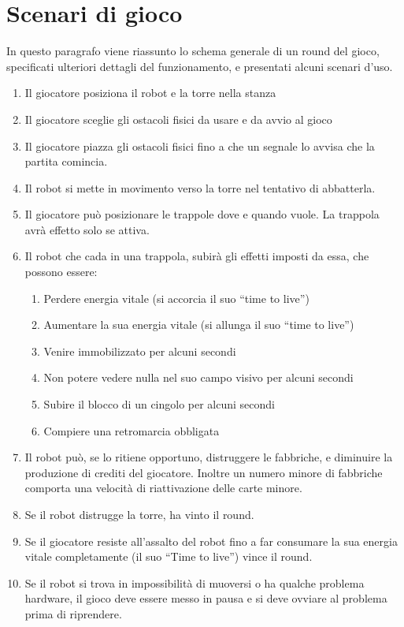 \section{Scenari di gioco}
In questo paragrafo viene riassunto lo schema generale di un round del gioco, specificati ulteriori dettagli del funzionamento, e presentati alcuni scenari d'uso.
\begin{enumerate}
    \item Il giocatore posiziona il robot e la torre nella stanza
	\item Il giocatore sceglie gli ostacoli fisici da usare e da avvio al gioco
	\item Il giocatore piazza gli ostacoli fisici fino a che un segnale lo avvisa che la partita comincia.
	\item Il robot si mette in movimento verso la torre nel tentativo di abbatterla.
	\item Il giocatore può posizionare le trappole dove e quando vuole. La trappola avrà effetto solo se attiva.
	\item Il robot che cada in una trappola, subirà gli effetti imposti da essa, che possono essere:
		\begin{enumerate}
		\item Perdere energia vitale (si accorcia il suo ``time to live'')
		\item Aumentare la sua energia vitale (si allunga il suo ``time to live'')
		\item Venire immobilizzato per alcuni secondi
		\item Non potere vedere nulla nel suo campo visivo per alcuni secondi
		\item Subire il blocco di un cingolo per alcuni secondi
		\item Compiere una retromarcia obbligata
		\end{enumerate}
	\item Il robot può, se lo ritiene opportuno, distruggere le fabbriche, e diminuire la produzione di crediti del giocatore. Inoltre un numero minore di fabbriche comporta una  velocità di riattivazione delle carte minore.
	\item Se il robot distrugge la torre, ha vinto il round.
	\item Se il giocatore resiste all'assalto del robot fino a far consumare la sua energia vitale completamente (il suo ``Time to live'') vince il round.
	\item Se il robot si trova in impossibilità di muoversi o ha qualche problema hardware, il gioco deve essere messo in pausa e si deve ovviare al problema prima di riprendere.
	\end{enumerate}
